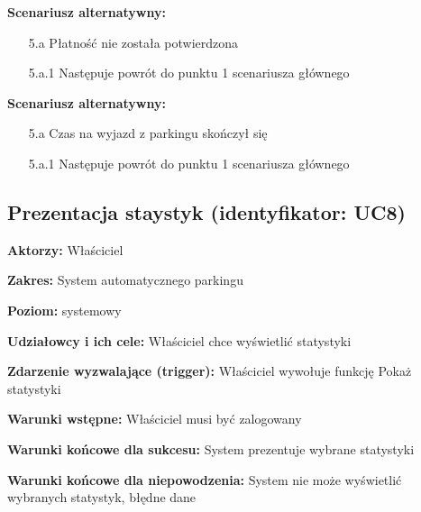 \hspace{0cm}\textbf{Scenariusz alternatywny: }
\begin{enumerate}
\item[5.a] Płatność nie została potwierdzona
\item[5.a.1] Następuje powrót do punktu 1 scenariusza głównego
\end{enumerate}

\hspace{0cm}\textbf{Scenariusz alternatywny: }
\begin{enumerate}
\item[5.a] Czas na wyjazd z parkingu skończył się
\item[5.a.1] Następuje powrót do punktu 1 scenariusza głównego
\end{enumerate}

\subsection{Prezentacja staystyk (identyfikator: UC8)}
\textbf{Aktorzy: }Właściciel

\hspace{0cm}\textbf{Zakres: }System automatycznego parkingu

\hspace{0cm}\textbf{Poziom: }systemowy

\hspace{0cm}\textbf{Udziałowcy i ich cele: } Właściciel chce wyświetlić statystyki

\hspace{0cm}\textbf{Zdarzenie wyzwalające (trigger): } Właściciel wywołuje funkcję Pokaż statystyki

\hspace{0cm}\textbf{Warunki wstępne: }
Właściciel musi być zalogowany

\hspace{0cm}\textbf{Warunki końcowe dla sukcesu: } System prezentuje wybrane statystyki

\hspace{0cm}\textbf{Warunki końcowe dla niepowodzenia: } System nie może wyświetlić wybranych statystyk, błędne dane \newline

